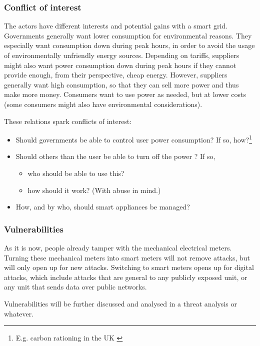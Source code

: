 \subsubsection{Conflict of interest}
The actors have different interests and potential gains with a smart grid.
Governments generally want lower consumption for environmental reasons.
They especially want consumption down during peak hours, in order to avoid the usage of environmentally unfriendly energy sources.
Depending on tariffs, suppliers might also want power consumption down during peak hours if they cannot provide enough, from their perspective, cheap energy.
However, suppliers generally want high consumption, so that they can sell more power and thus make more money.
Consumers want to use power as needed, but at lower costs (some consumers might also have environmental considerations).

These relations spark conflicts of interest:
\begin{itemize}
	\item Should governments be able to control user power consumption? If so, how?\footnote{E.g. carbon rationing in the UK \cite[]{security_economics}}
	\item Should others than the user be able to turn off the power \cite[]{offswitch}? If so,
	\begin{itemize}
		\item who should be able to use this?
		\item how should it work? (With abuse in mind.)
	\end{itemize}
	\item How, and by who, should smart appliances be managed?
\end{itemize}

\subsubsection{Vulnerabilities}
As it is now, people already tamper with the mechanical electrical meters.
Turning these mechanical meters into smart meters will not remove attacks, but will only open up for new attacks.
Switching to smart meters opens up for digital attacks, which include attacks that are general to any publicly exposed unit, or any unit that sends data over public networks.

Vulnerabilities will be further discussed and analysed in a threat analysis or whatever.